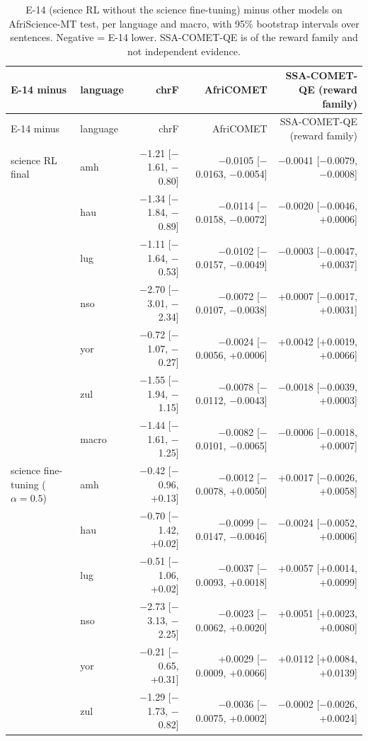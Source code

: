 {\scriptsize\setlength{\tabcolsep}{1.5pt}
\begin{longtable}{@{}llrrr@{}}
\caption{E-14 (science RL without the science fine-tuning) minus other models on AfriScience-MT test, per language and macro, with 95\% bootstrap intervals over sentences. Negative = E-14 lower. SSA-COMET-QE is of the reward family and not independent evidence.}\label{tab:e14-per-language}\\
\toprule
E-14 minus & language & chrF & AfriCOMET & SSA-COMET-QE (reward family) \\
\midrule\endfirsthead
\toprule
E-14 minus & language & chrF & AfriCOMET & SSA-COMET-QE (reward family) \\
\midrule\endhead
\midrule\endfoot
\bottomrule\endlastfoot
science RL final & amh & $-$1.21 [$-$1.61, $-$0.80] & $-$0.0105 [$-$0.0163, $-$0.0054] & $-$0.0041 [$-$0.0079, $-$0.0008] \\
 & hau & $-$1.34 [$-$1.84, $-$0.89] & $-$0.0114 [$-$0.0158, $-$0.0072] & $-$0.0020 [$-$0.0046, +0.0006] \\
 & lug & $-$1.11 [$-$1.64, $-$0.53] & $-$0.0102 [$-$0.0157, $-$0.0049] & $-$0.0003 [$-$0.0047, +0.0037] \\
 & nso & $-$2.70 [$-$3.01, $-$2.34] & $-$0.0072 [$-$0.0107, $-$0.0038] & +0.0007 [$-$0.0017, +0.0031] \\
 & yor & $-$0.72 [$-$1.07, $-$0.27] & $-$0.0024 [$-$0.0056, +0.0006] & +0.0042 [+0.0019, +0.0066] \\
 & zul & $-$1.55 [$-$1.94, $-$1.15] & $-$0.0078 [$-$0.0112, $-$0.0043] & $-$0.0018 [$-$0.0039, +0.0003] \\
 & macro & $-$1.44 [$-$1.61, $-$1.25] & $-$0.0082 [$-$0.0101, $-$0.0065] & $-$0.0006 [$-$0.0018, +0.0007] \\
\midrule
science fine-tuning ($\alpha=0.5$) & amh & $-$0.42 [$-$0.96, +0.13] & $-$0.0012 [$-$0.0078, +0.0050] & +0.0017 [$-$0.0026, +0.0058] \\
 & hau & $-$0.70 [$-$1.42, +0.02] & $-$0.0099 [$-$0.0147, $-$0.0046] & $-$0.0024 [$-$0.0052, +0.0006] \\
 & lug & $-$0.51 [$-$1.06, +0.02] & $-$0.0037 [$-$0.0093, +0.0018] & +0.0057 [+0.0014, +0.0099] \\
 & nso & $-$2.73 [$-$3.13, $-$2.25] & $-$0.0023 [$-$0.0062, +0.0020] & +0.0051 [+0.0023, +0.0080] \\
 & yor & $-$0.21 [$-$0.65, +0.31] & +0.0029 [$-$0.0009, +0.0066] & +0.0112 [+0.0084, +0.0139] \\
 & zul & $-$1.29 [$-$1.73, $-$0.82] & $-$0.0036 [$-$0.0075, +0.0002] & $-$0.0002 [$-$0.0026, +0.0024] \\

\end{longtable}}
